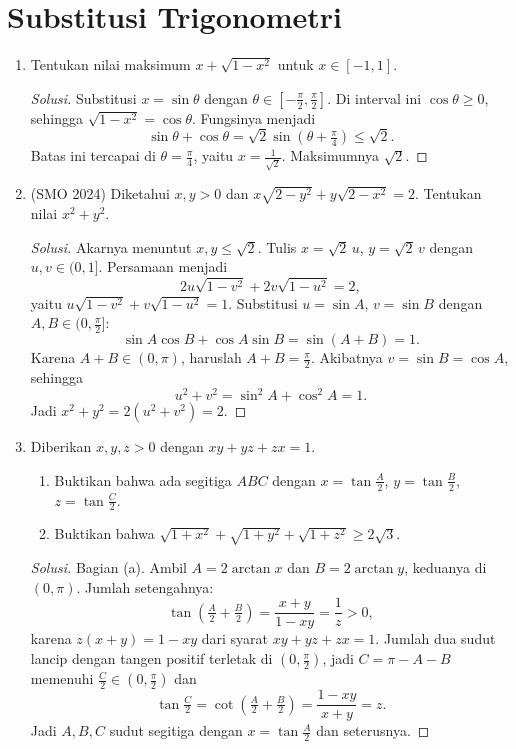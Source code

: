 \documentclass[12pt]{scrartcl}
\begin{document}
\section{Substitusi Trigonometri}

\begin{enumerate}

	\item
	Tentukan nilai maksimum $x + \sqrt{1-x^2}$ untuk $x \in [-1, 1]$.
	\begin{proof}[Solusi]
	Substitusi $x = \sin\theta$ dengan $\theta \in [-\frac{\pi}{2}, \frac{\pi}{2}]$.
	Di interval ini $\cos\theta \ge 0$, sehingga $\sqrt{1-x^2} = \cos\theta$.
	Fungsinya menjadi
	\[ \sin\theta + \cos\theta = \sqrt{2}\sin\left(\theta+\tfrac{\pi}{4}\right) \le \sqrt{2}. \]
	Batas ini tercapai di $\theta = \frac{\pi}{4}$, yaitu $x = \frac{1}{\sqrt{2}}$.
	Maksimumnya $\sqrt{2}$.
	\end{proof}

	\item (SMO 2024)
	Diketahui $x, y > 0$ dan $x\sqrt{2-y^2} + y\sqrt{2-x^2} = 2$.
	Tentukan nilai $x^2+y^2$.
	\begin{proof}[Solusi]
	Akarnya menuntut $x, y \le \sqrt{2}$. Tulis $x = \sqrt{2}\,u$,
	$y = \sqrt{2}\,v$ dengan $u, v \in (0, 1]$. Persamaan menjadi
	\[ 2u\sqrt{1-v^2} + 2v\sqrt{1-u^2} = 2, \]
	yaitu $u\sqrt{1-v^2} + v\sqrt{1-u^2} = 1$.
	Substitusi $u = \sin A$, $v = \sin B$ dengan $A, B \in (0, \frac{\pi}{2}]$:
	\[ \sin A\cos B + \cos A\sin B = \sin(A+B) = 1. \]
	Karena $A+B \in (0, \pi)$, haruslah $A+B = \frac{\pi}{2}$.
	Akibatnya $v = \sin B = \cos A$, sehingga
	\[ u^2 + v^2 = \sin^2 A + \cos^2 A = 1. \]
	Jadi $x^2 + y^2 = 2(u^2+v^2) = 2$.
	\end{proof}

	\item
	Diberikan $x, y, z > 0$ dengan $xy+yz+zx = 1$.
	\begin{enumerate}
		\item Buktikan bahwa ada segitiga $ABC$ dengan $x = \tan\frac{A}{2}$,
		$y = \tan\frac{B}{2}$, $z = \tan\frac{C}{2}$.
		\item Buktikan bahwa $\sqrt{1+x^2} + \sqrt{1+y^2} + \sqrt{1+z^2} \ge 2\sqrt{3}$.
	\end{enumerate}
	\begin{proof}[Solusi]
	Bagian (a). Ambil $A = 2\arctan x$ dan $B = 2\arctan y$,
	keduanya di $(0, \pi)$. Jumlah setengahnya:
	\[ \tan\left(\tfrac{A}{2}+\tfrac{B}{2}\right)
	= \frac{x+y}{1-xy} = \frac{1}{z} > 0, \]
	karena $z(x+y) = 1-xy$ dari syarat $xy+yz+zx = 1$.
	Jumlah dua sudut lancip dengan tangen positif terletak di $(0, \frac{\pi}{2})$,
	jadi $C = \pi - A - B$ memenuhi $\frac{C}{2} \in (0, \frac{\pi}{2})$ dan
	\[ \tan\tfrac{C}{2} = \cot\left(\tfrac{A}{2}+\tfrac{B}{2}\right)
	= \frac{1-xy}{x+y} = z. \]
	Jadi $A, B, C$ sudut segitiga dengan $x = \tan\frac{A}{2}$ dan seterusnya.


\end{proof}
\end{enumerate}
\end{document}

